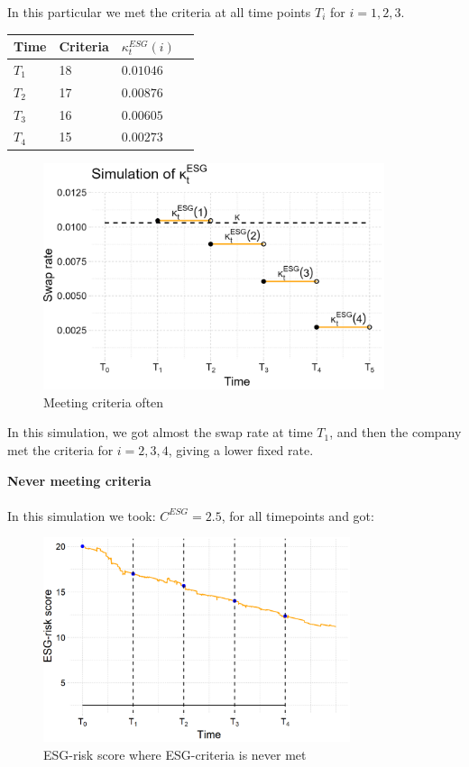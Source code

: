 In this particular we met the criteria at all time points $T_{i}$ for $i=1,2,3$. 


\begin{center}
    \begin{tabular}{ | l | l | l | p{5cm} |}
    \hline
    Time    & Criteria   & $\kappa_{t}^{ESG}(i)$ \\ \hline
    $T_{1}$ &   18       & $0.01046$  \\ \hline
    $T_{2}$ &   17       & $0.00876$  \\ \hline
    $T_{3}$ &   16       & $0.00605$\\ \hline
    $T_{4}$ &   15       & $0.00273$ \\ \hline
    \end{tabular}
\end{center} 

\begin{figure}[htp]
    \centering
    \includegraphics[width= 10cm]{figures/ESG/kappa_t_ESG_2.png}
    \caption{Meeting criteria often}
    \label{fig: ESG_swap_2}
\end{figure}

In this simulation, we got almost the swap rate at time $T_{1}$, and then the company met the criteria for $i=2,3,4$, giving a lower fixed rate. 


\newpage
\textbf{Never meeting criteria}
\\~\\ 
In this simulation we took: $C^{ESG} = 2.5$, for all timepoints and got: 

\begin{figure}[htp]
    \centering
    \includegraphics[width=9cm]{figures/ESG/ESG_plt_criteria3.png}
    \caption{ESG-risk score where ESG-criteria is never met}
    \label{fig: ESG-risk_score_criteria3}
\end{figure}




